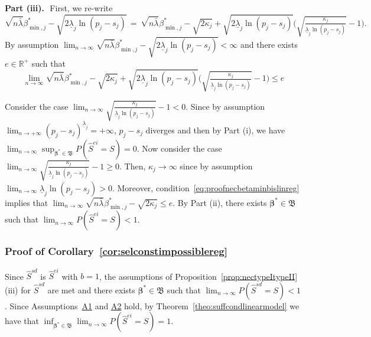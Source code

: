 \documentclass[
  12pt]{article}
\newcommand{\R}{\mathbb{R}}
\newcommand{\bbeta}{\boldsymbol{\beta}}
\newcommand{\bB}{\mathfrak{B}}
\begin{document}
\textbf{Part (iii).}\,\,
 First, we re-write 
 $$\sqrt{n\bar{\lambda}}\beta_{\min,j}^*-\sqrt{2\underline{\lambda}_j\ln(p_j-s_j)} \,=\, \sqrt{n\bar{\lambda}}\beta_{\min,j}^*-\sqrt{2\kappa_j}+\sqrt{2\underline{\lambda}_j\ln(p_j-s_j)}\Big(\sqrt{\tfrac{\kappa_j}{\underline{\lambda}_j\ln(p_j-s_j)}}-1\Big).$$ 
 By assumption $\lim_{n\to\infty}\sqrt{n\bar{\lambda}}\beta_{\min,j}^*-\sqrt{2\underline{\lambda}_j\ln(p_j-s_j)} < \infty$ and there exists $e\in\R^+$ such that
  \begin{equation}\label{eq:proofnecbetaminbislinreg}
      \lim_{n\to \infty}\sqrt{n\bar{\lambda}}\beta_{\min,j}^*-\sqrt{2\kappa_j}+\sqrt{2\underline{\lambda}_j\ln(p_j-s_j)}\Big(\sqrt{\tfrac{\kappa_j}{\underline{\lambda}_j\ln(p_j-s_j)}}-1\Big)\leq e
  \end{equation}

Consider the case $\lim_{n\to \infty}\sqrt{\tfrac{\kappa_j}{\underline{\lambda}_j\ln(p_j-s_j)}}-1<0$. Since by assumption $\lim_{n\to+\infty}(p_j-s_j)^{\underline{\lambda}_j}=+\infty$, $p_j-s_j$ diverges and then by Part (i), we have $\lim_{n\to \infty}\sup_{\bbeta^*\in\bB}P(\hat{S}^{ei} = S)=0$. Now consider the case $\lim_{n\to \infty}\sqrt{\tfrac{\kappa_j}{\underline{\lambda}_j\ln(p_j-s_j)}}-1 \geq0$. Then, $\kappa_j\to\infty$ since by assumption $\lim_{n\to \infty}\underline{\lambda}_j\ln(p_j-s_j) >0$. Moreover, condition~\eqref{eq:proofnecbetaminbislinreg} implies that $\lim_{n\to \infty}\sqrt{n\bar{\lambda}}\beta_{\min,j}^*-\sqrt{2\kappa_j} \leq e$. By Part (ii), there exists $\bbeta^*\in\bB$ such that $\lim_{n\to \infty}P(\hat{S}^{ei} = S)< 1$.

\subsubsection{Proof of Corollary~\ref{cor:selconstimpossiblereg}}
Since $\hat{S}^{sd}$ is $\hat{S}^{ei}$ with $b=1$, the assumptions of Proposition~\ref{prop:nectypeItypeII} (iii) for $\hat{S}^{sd}$ are met and there exists $\bbeta^*\in\mathfrak{B}$ such that $\lim_{n \to \infty} P(\hat{S}^{sd} = S) < 1$. Since Assumptions~\hyperlink{lab:A1}{A1} and \hyperlink{lab:A2}{A2} hold, by Theorem~\ref{theo:suffcondlinearmodel} we have that $\inf_{\bbeta^*\in\mathfrak{B}}\lim_{n \to \infty} P(\hat{S}^{ei} = S)= 1$.
\end{document}
